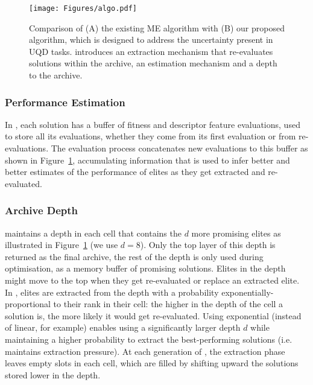 \begin{figure}[t!]
  \centering
  \texttt{[image: Figures/algo.pdf]}
  \caption{
    Comparison of (A) the existing ME algorithm with (B) our proposed \name{} algorithm, which is designed to address the uncertainty present in UQD tasks. 
    \name{} introduces an extraction mechanism that re-evaluates solutions within the archive, an estimation mechanism and a depth to the archive. 
  }
  \label{fig:algo}
\end{figure}


\subsubsection{Performance Estimation} 
In \name{}, each solution has a buffer of fitness and descriptor feature evaluations, used to store all its evaluations, whether they come from its first evaluation or from re-evaluations. 
The evaluation process concatenates new evaluations to this buffer as shown in Figure~\ref{fig:algo}, accumulating information that is used to infer better and better estimates of the performance of elites as they get extracted and re-evaluated. 

\subsubsection{Archive Depth} \label{sec:depth}
\name{} maintains a depth in each cell that contains the $d$ more promising elites as illustrated in Figure~\ref{fig:algo} (we use $d=8$). Only the top layer of this depth is returned as the final archive, the rest of the depth is only used during optimisation, as a memory buffer of promising solutions. Elites in the depth might move to the top when they get re-evaluated or replace an extracted elite.
In \name{}, elites are extracted from the depth with a probability exponentially-proportional to their rank in their cell: the higher in the depth of the cell a solution is, the more likely it would get re-evaluated. Using exponential (instead of linear, for example) enables using a significantly larger depth $d$ while maintaining a higher probability to extract the best-performing solutions (i.e. maintains extraction pressure). 
At each generation of \name{}, the extraction phase leaves empty slots in each cell, which are filled by shifting upward the solutions stored lower in the depth.


